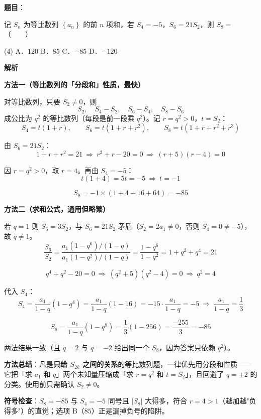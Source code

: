 \begin{answer}

\textbf{题目}：

记 $S_n$ 为等比数列 $\left\{a_n\right\}$ 的前 $n$ 项和，若 $S_4=-5$，$S_6=21S_2$，则 $S_8=$\mbox{（　　）}

\begin{gkopts}(4)
\task A．$120$
\task B．$85$
\task C．$-85$
\task D．$-120$
\end{gkopts}

\textbf{解析}

\textbf{方法一（等比数列的「分段和」性质，最快）}

对等比数列，只要 $S_2\ne0$，则
\nopagebreak[4]
\[S_2,\quad S_4-S_2,\quad S_6-S_4,\quad S_8-S_6\]
成公比为 $q^{2}$ 的等比数列（每段是前一段乘 $q^{2}$）。记 $r=q^{2}>0$，$t=S_2$：
\nopagebreak[4]
\[S_4=t(1+r),\qquad S_6=t\left(1+r+r^{2}\right),\qquad S_8=t\left(1+r+r^{2}+r^{3}\right)\]

由 $S_6=21S_2$：
\nopagebreak[4]
\[1+r+r^{2}=21\ \Longrightarrow\ r^{2}+r-20=0\ \Longrightarrow\ (r+5)(r-4)=0\]

因 $r=q^{2}>0$，取 $r=4$。再由 $S_4=-5$：
\nopagebreak[4]
\[t(1+4)=5t=-5\ \Longrightarrow\ t=-1\]

\nopagebreak[4]
\[S_8=-1\times\left(1+4+16+64\right)=-85\]

\textbf{方法二（求和公式，通用但略繁）}

若 $q=1$ 则 $S_6=3S_2$，与 $S_6=21S_2$ 矛盾（$S_2=2a_1\ne0$，否则 $S_4=0\ne-5$），故 $q\ne1$。
\nopagebreak[4]
\[\frac{S_6}{S_2}=\frac{a_1\left(1-q^{6}\right)/(1-q)}{a_1\left(1-q^{2}\right)/(1-q)}=\frac{1-q^{6}}{1-q^{2}}=1+q^{2}+q^{4}=21\]

\nopagebreak[4]
\[q^{4}+q^{2}-20=0\ \Longrightarrow\ \left(q^{2}+5\right)\left(q^{2}-4\right)=0\ \Longrightarrow\ q^{2}=4\]

代入 $S_4$：
\nopagebreak[4]
\[S_4=\frac{a_1}{1-q}\left(1-q^{4}\right)=\frac{a_1}{1-q}(1-16)=-15\cdot\frac{a_1}{1-q}=-5\ \Longrightarrow\ \frac{a_1}{1-q}=\frac13\]

\nopagebreak[4]
\[S_8=\frac{a_1}{1-q}\left(1-q^{8}\right)=\frac13(1-256)=\frac{-255}3=-85\]

两法结果一致（且 $q=2$ 与 $q=-2$ 给出同一个 $S_8$，因为答案只依赖 $q^{2}$）。

\begin{gktip}
\textbf{方法总结}：凡是\textbf{只给 $S_{2k}$ 之间的关系}的等比数列题，一律优先用分段和性质——它把「求 $a_1$ 和 $q$」两个未知量压缩成「求 $r=q^{2}$ 和 $t=S_2$」，且回避了 $q=\pm2$ 的分类。使用前只需确认 $S_2\ne0$。

\textbf{符号检查}：$S_8=-85$ 与 $S_4=-5$ 同号且 $\left|S_8\right|$ 大得多，符合 $r=4>1$（越加越"负得多"）的直觉；选项 B（$85$）正是漏掉负号的陷阱。
\end{gktip}


\par\medskip

\end{answer}
